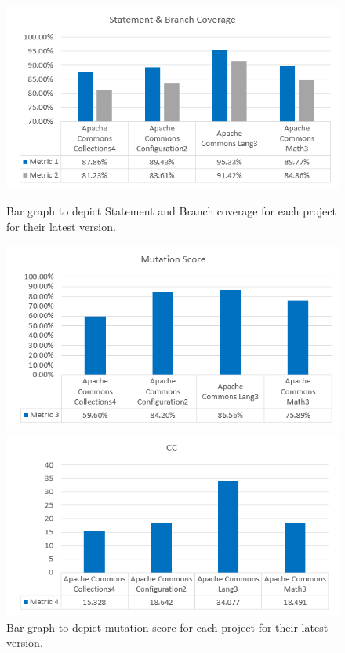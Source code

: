 \documentclass[letterpaper, 12 pt, conference]{ieeetran}  %
\begin{document}
\begin{figure}[H]
    \centering
    \includegraphics[scale=0.7]{Statement_Branch_analysis.PNG} %
    \caption{Bar graph to depict Statement and Branch coverage for each project for their latest version.}
     \vspace{0.00mm}
    \includegraphics[scale=0.7]{Mutation_Score_analysis.PNG} %
    \caption{Bar graph to depict mutation score for each project for their latest version.}
    \vspace{0.00mm}
    \includegraphics[scale=0.7]{Cyclomatic_Complexity_analysis.PNG} %

\end{figure}
\end{document}
